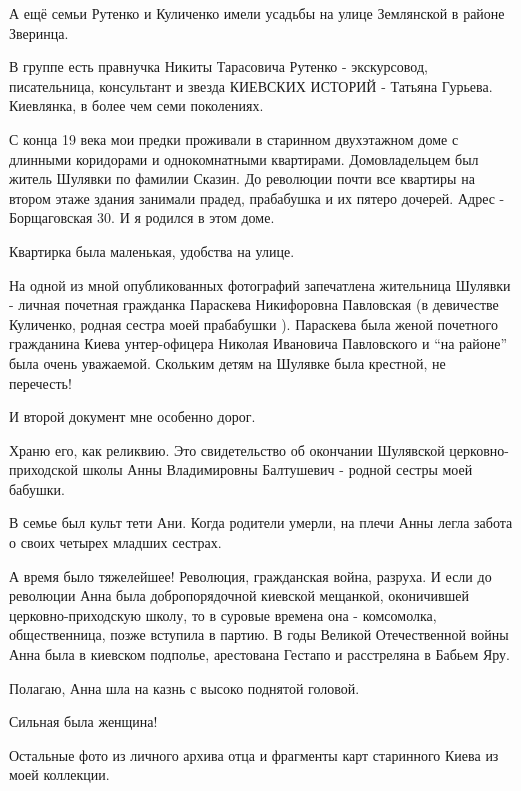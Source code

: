 А ещё семьи Рутенко и Куличенко имели усадьбы на улице Землянской в районе
Зверинца.

В группе есть правнучка Никиты Тарасовича Рутенко - экскурсовод, писательница,
консультант и звезда КИЕВСКИХ ИСТОРИЙ - Татьяна Гурьева. Киевлянка, в более чем
семи поколениях.



С конца 19 века мои предки проживали в старинном двухэтажном доме с длинными
коридорами и однокомнатными квартирами. Домовладельцем был житель Шулявки по
фамилии Сказин. До революции почти все квартиры на втором этаже здания занимали
прадед, прабабушка и их пятеро дочерей. Адрес - Борщаговская 30. И я родился в
этом доме.

Квартирка была маленькая, удобства на улице.

\raggedcolumns
\begin{multicols}{2} %
\setlength{\parindent}{0pt}


\end{multicols} %


На одной из мной опубликованных фотографий запечатлена жительница Шулявки -
личная почетная гражданка Параскева Никифоровна Павловская (в девичестве
Куличенко, родная сестра моей прабабушки ). Параскева была женой почетного
гражданина Киева унтер-офицера Николая Ивановича Павловского и \enquote{на районе} была
очень уважаемой. Скольким детям на Шулявке была крестной, не перечесть!


И второй документ мне особенно дорог.

Храню его, как реликвию. Это свидетельство об окончании Шулявской
церковно-приходской школы Анны Владимировны Балтушевич - родной сестры моей
бабушки.

В семье был культ тети Ани. Когда родители умерли, на плечи Анны легла забота о
своих четырех  младших сестрах.

А время было тяжелейшее! Революция, гражданская война, разруха. И если  до
революции Анна была добропорядочной киевской мещанкой, оконичившей
церковно-приходскую школу, то в суровые времена она - комсомолка,
общественница, позже вступила в партию. В годы Великой Отечественной войны Анна
была в киевском подполье, арестована Гестапо и расстреляна в Бабьем Яру. 

Полагаю, Анна шла на казнь с высоко поднятой головой. 

Сильная была женщина!

Остальные фото из личного архива 
отца и фрагменты карт старинного Киева из моей коллекции.

